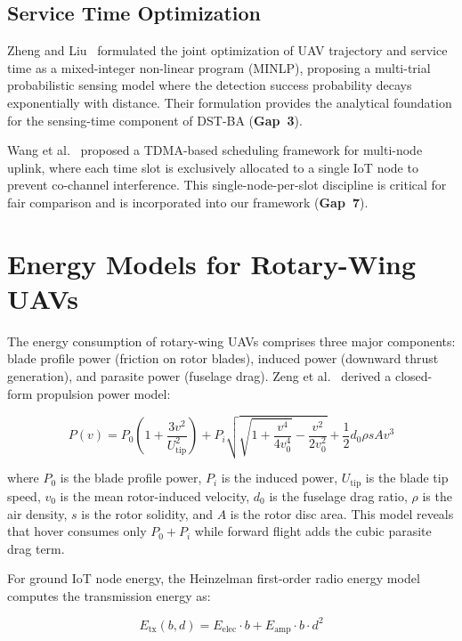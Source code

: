 \documentclass[12pt, a4paper, oneside]{report}
\begin{document}
\subsection{Service Time Optimization}

Zheng and Liu~\cite{zheng2025tvt} formulated the joint optimization of UAV trajectory and service time as a mixed-integer non-linear program (MINLP), proposing a multi-trial probabilistic sensing model where the detection success probability decays exponentially with distance. Their formulation provides the analytical foundation for the sensing-time component of DST-BA (\textbf{Gap~3}).

Wang et al.~\cite{wang2022iot} proposed a TDMA-based scheduling framework for multi-node uplink, where each time slot is exclusively allocated to a single IoT node to prevent co-channel interference. This single-node-per-slot discipline is critical for fair comparison and is incorporated into our framework (\textbf{Gap~7}).

\section{Energy Models for Rotary-Wing UAVs}

The energy consumption of rotary-wing UAVs comprises three major components: blade profile power (friction on rotor blades), induced power (downward thrust generation), and parasite power (fuselage drag). Zeng et al.~\cite{zeng2019energy} derived a closed-form propulsion power model:

\begin{equation}
P(v) = P_0\left(1 + \frac{3v^2}{U_{\text{tip}}^2}\right) + P_i\sqrt{\sqrt{1 + \frac{v^4}{4v_0^4}} - \frac{v^2}{2v_0^2}} + \frac{1}{2}d_0 \rho s A v^3
\label{eq:propulsion_lit}
\end{equation}

where $P_0$ is the blade profile power, $P_i$ is the induced power, $U_{\text{tip}}$ is the blade tip speed, $v_0$ is the mean rotor-induced velocity, $d_0$ is the fuselage drag ratio, $\rho$ is the air density, $s$ is the rotor solidity, and $A$ is the rotor disc area. This model reveals that hover consumes only $P_0 + P_i$ while forward flight adds the cubic parasite drag term.

For ground IoT node energy, the Heinzelman first-order radio energy model~\cite{heinzelman2000leach} computes the transmission energy as:

\begin{equation}
E_{\text{tx}}(b, d) = E_{\text{elec}} \cdot b + E_{\text{amp}} \cdot b \cdot d^2
\label{eq:heinzelman_lit}
\end{equation}
\end{document}
